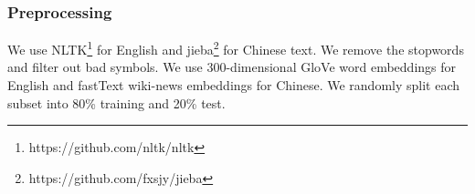 









\subsubsection{Preprocessing}
We use NLTK\footnote{https://github.com/nltk/nltk} for English and jieba\footnote{https://github.com/fxsjy/jieba} for Chinese text.
We remove the stopwords and filter out bad symbols. 
We use 300-dimensional GloVe word embeddings \cite{pennington2014glove} 
for English and fastText wiki-news embeddings \cite{mikolov2018advances} for Chinese. We randomly split each subset into 80\% training and 20\% test. 


